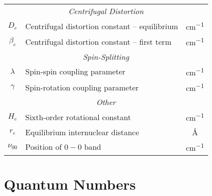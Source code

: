 \documentclass[11pt, twoside, fleqn]{report}
\newcommand{\dash}{\!-\!}
\begin{document}
\begin{table}[H]
\begin{tabular}{clc}
        \multicolumn{3}{c}{\textit{Centrifugal Distortion}}                                                                 \\
        \cmidrule(lr){1-3}
        $D_{e}$           & Centrifugal distortion constant -- equilibrium                               & \unit{cm^{-1}}   \\
        $\beta_{e}$       & Centrifugal distortion constant -- first term                                & \unit{cm^{-1}}   \\
        \multicolumn{3}{c}{\textit{Spin-Splitting}}                                                                         \\
        \cmidrule(lr){1-3}
        $\lambda$         & Spin-spin coupling parameter                                                 & \unit{cm^{-1}}   \\
        $\gamma$          & Spin-rotation coupling parameter                                             & \unit{cm^{-1}}   \\
        \multicolumn{3}{c}{\textit{Other}}                                                                                  \\
        \cmidrule(lr){1-3}
        $H_{e}$           & Sixth-order rotational constant                                              & \unit{cm^{-1}}   \\
        $r_{e}$           & Equilibrium internuclear distance                                            & \unit{\angstrom} \\
        $\nu_{00}$        & Position of $0\dash0$ band                                                   & \unit{cm^{-1}}   \\
        \bottomrule
    \end{tabular}
\end{table}

\chapter{Quantum Numbers}
\label{a:quantum_numbers}
\end{document}
